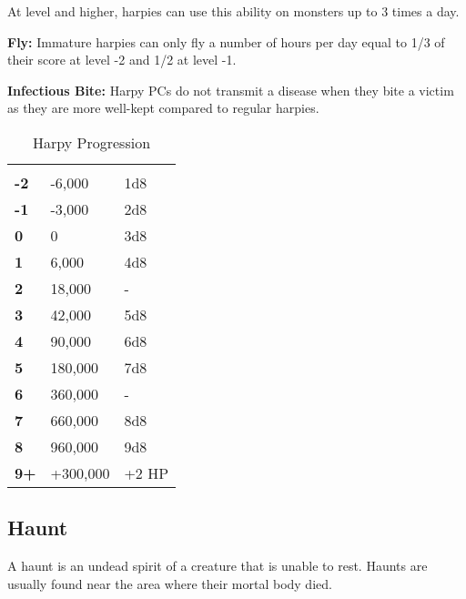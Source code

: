 \begin{multicols*}{2}
At  level and higher, harpies can use this ability on monsters up to 3 times a day.

\textbf{Fly:} Immature harpies can only fly a number of hours per day equal to 1/3 of their  score at level -2 and 1/2 at level -1.

\textbf{Infectious Bite:} Harpy PCs do not transmit a disease when they bite a victim as they are more well-kept compared to regular harpies.


\begin {table}[H]
  \caption{Harpy Progression}
  \begin{tabularx}{\columnwidth}{>{\bfseries}YYY}
	 &  & \\
	-2 & -6,000 & 1d8\\
	-1 & -3,000 & 2d8\\
	0 & 0 & 3d8\\
	1 & 6,000 & 4d8\\
	2 & 18,000 & -\\
	3 & 42,000 & 5d8\\
	4 & 90,000 & 6d8\\
	5 & 180,000 & 7d8\\
	6 & 360,000 & -\\
	7 & 660,000 & 8d8\\
	8 & 960,000 & 9d8\\
	9+ & +300,000 & +2 HP
  \end {tabularx}
\end {table}

\subsection{Haunt}
A haunt is an undead spirit of a creature that is unable to rest. Haunts are usually found near the area where their mortal body died.


\end{multicols*}
